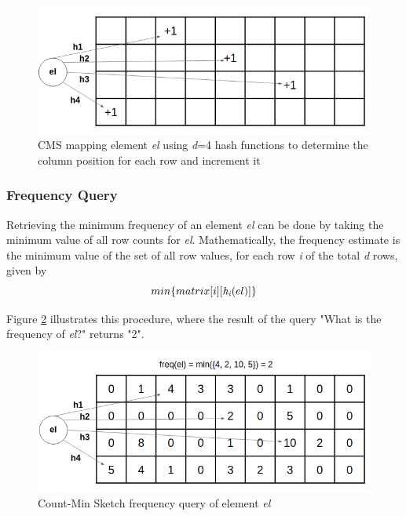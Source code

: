 \begin{figure}[!htb]
    \begin{center}
      \includegraphics[scale=0.5]{figures/insertion-cms.png}
      \caption[Count-Min Sketch insertion]{CMS mapping element \textit{el} using \textit{d}=4 hash functions to determine the column position for each row and increment it}
      \label{fig:cms}
    \end{center}
\end{figure}

\subsubsection*{Frequency Query}
Retrieving the minimum frequency of an element \textit{el} can be done by taking the minimum value of all row counts for \textit{el}. Mathematically, the frequency estimate is the minimum value of the set of all row values, for each row \textit{i} of the total \textit{d} rows, given by
\[ min \{matrix[i][\textit{h\textsubscript{i}}(el)]\} \]

Figure \ref{fig:query-cms} illustrates this procedure, where the result of the query "What is the frequency of \textit{el}?" returns "2".
   
\begin{figure}[!htb]
    \begin{center}
      \includegraphics[scale=0.5]{figures/query-cms.png}
      \caption[Count-Min Sketch frequency query]{Count-Min Sketch frequency query of element \textit{el}}
      \label{fig:query-cms}
    \end{center}
\end{figure}

